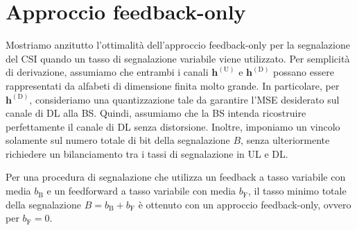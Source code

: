 \section{Approccio feedback-only}

Mostriamo anzitutto l'ottimalità dell'approccio feedback-only per la
segnalazione del CSI quando un tasso di segnalazione variabile viene
utilizzato. Per semplicità di derivazione, assumiamo che entrambi i canali
\(\bm{h}^\mathrm{(U)}\) e \(\bm{h}^\mathrm{(D)}\) possano essere rappresentati
da alfabeti di dimensione finita molto grande. In particolare, per
\(\bm{h}^\mathrm{(D)}\), consideriamo una quantizzazione tale da garantire
l'MSE desiderato sul canale di DL alla BS. Quindi, assumiamo che la BS intenda
ricostruire perfettamente il canale di DL senza distorsione. Inoltre, imponiamo
un vincolo solamente sul numero totale di bit della segnalazione \(B\), senza
ulteriormente richiedere un bilanciamento tra i tassi di segnalazione in UL e
DL.

\begin{thm}
    \label{thm:feedback-only}

    Per una procedura di segnalazione che utilizza un feedback a tasso
    variabile con media \(b_\mathrm{B}\) e un feedforward a tasso variabile con
    media \(b_\mathrm{F}\), il tasso minimo totale della segnalazione \(B =
    b_\mathrm{B} + b_\mathrm{F}\) è ottenuto con un approccio feedback-only,
    ovvero per \(b_\mathrm{F} = 0\).
\end{thm}

